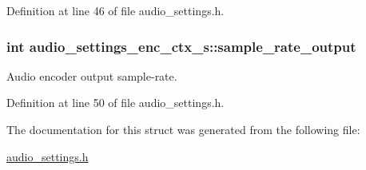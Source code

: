 Definition at line 46 of file audio\+\_\+settings.\+h.

\subsubsection[{\texorpdfstring{sample\+\_\+rate\+\_\+output}{sample_rate_output}}]{\setlength{\rightskip}{0pt plus 5cm}int audio\+\_\+settings\+\_\+enc\+\_\+ctx\+\_\+s\+::sample\+\_\+rate\+\_\+output}\hypertarget{structaudio__settings__enc__ctx__s_a1b0355d6fd3d67a9a5a623a984b0c56a}{}\label{structaudio__settings__enc__ctx__s_a1b0355d6fd3d67a9a5a623a984b0c56a}
Audio encoder output sample-\/rate. 

Definition at line 50 of file audio\+\_\+settings.\+h.



The documentation for this struct was generated from the following file\+:\begin{DoxyCompactItemize}
\item 
\hyperlink{audio__settings_8h}{audio\+\_\+settings.\+h}\end{DoxyCompactItemize}
